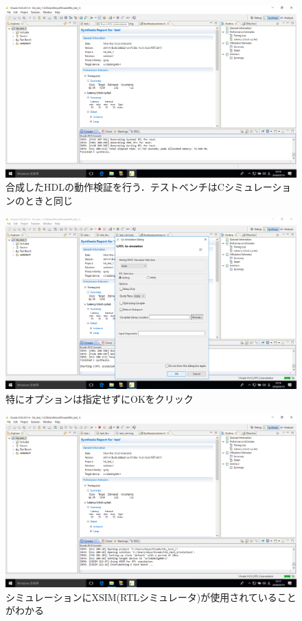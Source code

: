 \documentclass[a4paper,dvipdfmx]{jsarticle}
\begin{document}
 \begin{figure}[H]
  \begin{center}
   \includegraphics[width=.8\textwidth]{chapter08_figures/VirtualBox_Windows10_19_03_2018_23_18_47.png}
  \end{center}
  \caption{合成したHDLの動作検証を行う．テストベンチはCシミュレーションのときと同じ}
 \end{figure}

 \begin{figure}[H]
  \begin{center}
   \includegraphics[width=.8\textwidth]{chapter08_figures/VirtualBox_Windows10_19_03_2018_23_18_57.png}
  \end{center}
  \caption{特にオプションは指定せずにOKをクリック}
 \end{figure}

 \begin{figure}[H]
  \begin{center}
   \includegraphics[width=.8\textwidth]{chapter08_figures/VirtualBox_Windows10_19_03_2018_23_19_18.png}
  \end{center}
  \caption{シミュレーションにXSIM(RTLシミュレータ)が使用されていることがわかる}
 \end{figure}
\end{document}
